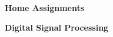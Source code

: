 \documentclass{article}
\begin{document}
\textbf{\Large Home Assignments}
\vspace{0.15cm}

\textbf{\large Digital Signal Processing}


\vspace{0.15cm}









\end{document}
